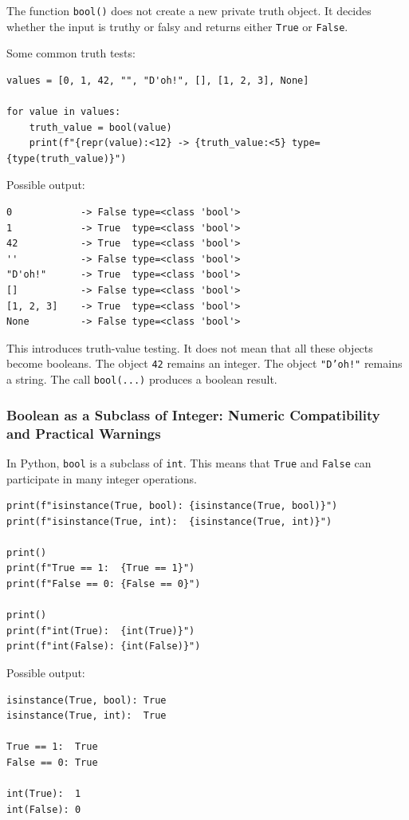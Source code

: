 The function \texttt{bool()} does not create a new private truth object. It decides whether the input is truthy or falsy and returns either \texttt{True} or \texttt{False}.

Some common truth tests:

\begin{verbatim}
values = [0, 1, 42, "", "D'oh!", [], [1, 2, 3], None]

for value in values:
    truth_value = bool(value)
    print(f"{repr(value):<12} -> {truth_value:<5} type={type(truth_value)}")
\end{verbatim}

Possible output:

\begin{verbatim}
0            -> False type=<class 'bool'>
1            -> True  type=<class 'bool'>
42           -> True  type=<class 'bool'>
''           -> False type=<class 'bool'>
"D'oh!"      -> True  type=<class 'bool'>
[]           -> False type=<class 'bool'>
[1, 2, 3]    -> True  type=<class 'bool'>
None         -> False type=<class 'bool'>
\end{verbatim}

This introduces truth-value testing. It does not mean that all these objects become booleans. The object \texttt{42} remains an integer. The object \texttt{"D'oh!"} remains a string. The call \texttt{bool(...)} produces a boolean result.

\subsubsection{Boolean as a Subclass of Integer: Numeric Compatibility and Practical Warnings}

In Python, \texttt{bool} is a subclass of \texttt{int}. This means that \texttt{True} and \texttt{False} can participate in many integer operations.

\begin{verbatim}
print(f"isinstance(True, bool): {isinstance(True, bool)}")
print(f"isinstance(True, int):  {isinstance(True, int)}")

print()
print(f"True == 1:  {True == 1}")
print(f"False == 0: {False == 0}")

print()
print(f"int(True):  {int(True)}")
print(f"int(False): {int(False)}")
\end{verbatim}

Possible output:

\begin{verbatim}
isinstance(True, bool): True
isinstance(True, int):  True

True == 1:  True
False == 0: True

int(True):  1
int(False): 0
\end{verbatim}

